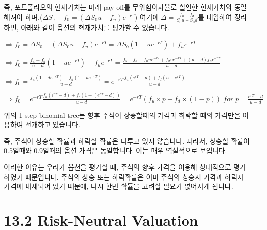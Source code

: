 \documentclass[
  letterpaper,
  DIV=11,
  numbers=noendperiod]{scrreprt}
\begin{document}
즉, 포트폴리오의 현재가치는 미래 pay-off를 무위험이자율로 할인한
현재가치와 동일해져야 하며,(\(\Delta S_0-f_0=(\Delta S_0u-f_u)e^{-rT}\))
여기에 \(\Delta=\frac{f_u-f_d}{S_0u-S_0d}\)를 대입하여 정리하면, 아래와
같이 옵션의 현재가치를 평가할 수 있습니다.

\(\Rightarrow f_0=\Delta S_0-(\Delta S_0u-f_u)e^{-rT}=\Delta S_0(1-ue^{-rT})+f_ue^{-rT}\)

\(\Rightarrow f_0=\frac{f_u-f_d}{u-d}(1-ue^{-rT})+f_ue^{-rT}=\frac{f_u-f_d-f_uue^{-rT}+f_due^{-rT}+(u-d)f_ue^{-rT}}{u-d}\)

\(\Rightarrow f_0=\frac{f_u(1-de^{-rT})-f_d(1-ue^{-rT})}{u-d}=e^{-rT}\frac{f_u(e^{rT}-d)+f_d(u-e^{rT})}{u-d}\)

\(\Rightarrow f_0=e^{-rT}\frac{f_u(e^{rT}-d)+f_d(1-(e^{rT}-d))}{u-d}=e^{-rT}(f_u\times p+f_d\times(1-p))\;for\;p=\frac{e^{rT}-d}{u-d}\)

\begin{tcolorbox}[enhanced jigsaw, titlerule=0mm, bottomtitle=1mm, left=2mm, title=\textcolor{quarto-callout-important-color}{\faExclamation}\hspace{0.5em}{Probability of stock price}, toptitle=1mm, bottomrule=.15mm, colframe=quarto-callout-important-color-frame, breakable, opacityback=0, rightrule=.15mm, opacitybacktitle=0.6, coltitle=black, colback=white, arc=.35mm, colbacktitle=quarto-callout-important-color!10!white, toprule=.15mm, leftrule=.75mm]

위의 1-step binomial tree는 향후 주식이 상승할때의 가격과 하락할 때의
가격만을 이용하여 전개하고 있습니다.

즉, 주식이 상승할 확률과 하락할 확률은 다루고 있지 않습니다. 따라서,
상승할 확률이 0.5일때와 0.9일때의 옵션 가격은 동일합니다. 이는 매우
역설적으로 보입니다.

이러한 이유는 우리가 옵션을 평가할 때, 주식의 향후 가격을 이용해
상대적으로 평가하였기 때문입니다. 주식의 상승 또는 하락확률은 이미
주식의 상승시 가격과 하락시 가격에 내재되어 있기 때문에, 다시 한번
확률을 고려할 필요가 없어지게 됩니다.

\end{tcolorbox}

\section*{13.2 Risk-Neutral Valuation}\label{risk-neutral-valuation}

\end{document}
